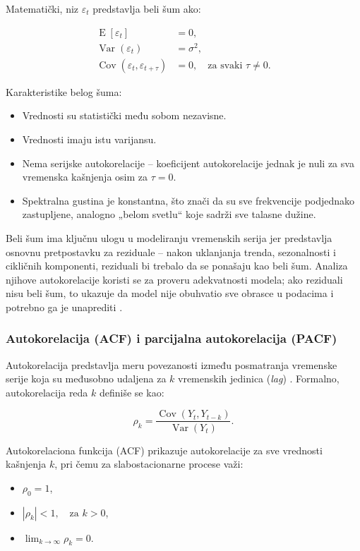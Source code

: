 \documentclass[12pt]{article}
\begin{document}
Matematički, niz $\varepsilon_t$ predstavlja beli šum ako:

\begin{align*}
\operatorname{E}[\varepsilon_t] &= 0, \\
\operatorname{Var}(\varepsilon_t) &= \sigma^2, \\
\operatorname{Cov}(\varepsilon_t, \varepsilon_{t+\tau}) &= 0, \quad \text{za svaki } \tau \neq 0.
\end{align*}


Karakteristike belog šuma:

\begin{itemize}
\item Vrednosti su statistički među sobom nezavisne.
\item Vrednosti imaju istu varijansu.
\item Nema serijske autokorelacije – koeficijent autokorelacije jednak je nuli za sva vremenska kašnjenja osim za $\tau = 0$.
\item Spektralna gustina je konstantna, što znači da su sve frekvencije podjednako zastupljene, analogno „belom svetlu“ koje sadrži sve talasne dužine.
\end{itemize}

Beli šum ima ključnu ulogu u modeliranju vremenskih serija jer predstavlja osnovnu pretpostavku za reziduale – nakon uklanjanja trenda, sezonalnosti i cikličnih komponenti, reziduali bi trebalo da se ponašaju kao beli šum. Analiza njihove autokorelacije koristi se za proveru adekvatnosti modela; ako reziduali nisu beli šum, to ukazuje da model nije obuhvatio sve obrasce u podacima i potrebno ga je unaprediti \cite{box1970, brockwell2002}.


\subsubsection{Autokorelacija (ACF) i parcijalna autokorelacija (PACF)}

Autokorelacija predstavlja meru povezanosti između posmatranja vremenske serije koja su međusobno udaljena za $k$ vremenskih jedinica (\textit{lag}) \cite{box1970, brockwell2002}. Formalno, autokorelacija reda $k$ definiše se kao:

\[
\rho_k = \frac{\operatorname{Cov}(Y_t, Y_{t-k})}{\operatorname{Var}(Y_t)}.
\]

Autokorelaciona funkcija (ACF) prikazuje autokorelacije za sve vrednosti kašnjenja $k$, pri čemu za slabostacionarne procese važi:

\begin{itemize}
    \item $\rho_0 = 1$,
    \item $|\rho_k| < 1, \quad \text{za } k > 0$,
    \item $\lim_{k \to \infty} \rho_k = 0$.
\end{itemize}
\end{document}
